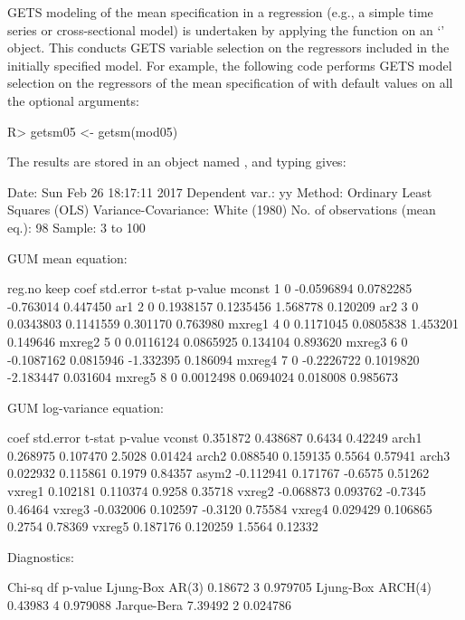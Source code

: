 \documentclass[article,nojss]{jss}
\begin{document}
GETS modeling of the mean specification in a regression (e.g., a
simple time series or cross-sectional model) is undertaken by applying
the  function on an `' object. This conducts GETS
variable selection on the regressors included in the initially
specified  model. For example, the following code performs
GETS model selection on the regressors of the mean specification of
 with default values on all the optional arguments:
%
\begin{CodeChunk}
\begin{CodeInput}
R> getsm05 <- getsm(mod05)
\end{CodeInput}
\end{CodeChunk}
%
The results are stored in an object named , and typing  gives:
%
\begin{CodeChunk}
\begin{CodeOutput}
Date: Sun Feb 26 18:17:11 2017 
Dependent var.: yy 
Method: Ordinary Least Squares (OLS)
Variance-Covariance: White (1980) 
No. of observations (mean eq.): 98 
Sample: 3 to 100 

GUM mean equation:

       reg.no keep       coef  std.error    t-stat  p-value
mconst      1    0 -0.0596894  0.0782285 -0.763014 0.447450
ar1         2    0  0.1938157  0.1235456  1.568778 0.120209
ar2         3    0  0.0343803  0.1141559  0.301170 0.763980
mxreg1      4    0  0.1171045  0.0805838  1.453201 0.149646
mxreg2      5    0  0.0116124  0.0865925  0.134104 0.893620
mxreg3      6    0 -0.1087162  0.0815946 -1.332395 0.186094
mxreg4      7    0 -0.2226722  0.1019820 -2.183447 0.031604
mxreg5      8    0  0.0012498  0.0694024  0.018008 0.985673

GUM log-variance equation:

            coef std.error  t-stat p-value
vconst  0.351872  0.438687  0.6434 0.42249
arch1   0.268975  0.107470  2.5028 0.01424
arch2   0.088540  0.159135  0.5564 0.57941
arch3   0.022932  0.115861  0.1979 0.84357
asym2  -0.112941  0.171767 -0.6575 0.51262
vxreg1  0.102181  0.110374  0.9258 0.35718
vxreg2 -0.068873  0.093762 -0.7345 0.46464
vxreg3 -0.032006  0.102597 -0.3120 0.75584
vxreg4  0.029429  0.106865  0.2754 0.78369
vxreg5  0.187176  0.120259  1.5564 0.12332

Diagnostics:

                   Chi-sq df  p-value
Ljung-Box AR(3)   0.18672  3 0.979705
Ljung-Box ARCH(4) 0.43983  4 0.979088
Jarque-Bera       7.39492  2 0.024786


\end{CodeOutput}
\end{CodeChunk}
\end{document}
